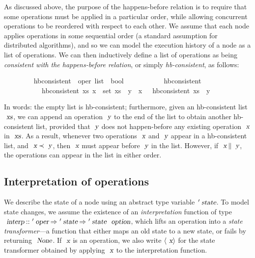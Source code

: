 As discussed above, the purpose of the happens-before relation is to require that some operations must be applied in a particular order, while allowing concurrent operations to be reordered with respect to each other.
We assume that each node applies operations in some sequential order (a standard assumption for distributed algorithms), and so we can model the execution history of a node as a list of operations.
We can then inductively define a list of operations as being \emph{consistent with the happens-before relation}, or simply \emph{hb-consistent}, as follows:
\vspace{0.25em}
\begin{isabellebody}
\ \ \ \ \ \ \ \  hb{\isacharunderscore}consistent\ {\isacharcolon}{\isacharcolon}\ {\isachardoublequoteopen}{\isacharprime}oper\ list\ {\isasymRightarrow}\ bool{\isachardoublequoteclose}\ \isanewline
\ \ \ \ \ \ \ \ \ \ {\isachardoublequoteopen}hb{\isacharunderscore}consistent\ {\isacharbrackleft}{\isacharbrackright}{\isachardoublequoteclose}\ {\isacharbar}\isanewline
\ \ \ \ \ \ \ \ \ \ {\isachardoublequoteopen}{\isasymlbrakk}\ hb{\isacharunderscore}consistent\ xs{\isacharsemicolon}\ {\isasymforall}x\ {\isasymin}\ set\ xs{\isachardot}\ {\isasymnot}\ y\ {\isasymprec}\ x\ {\isasymrbrakk}\ {\isasymLongrightarrow}\ hb{\isacharunderscore}consistent\ {\isacharparenleft}xs\ {\isacharat}\ {\isacharbrackleft}y{\isacharbrackright}{\isacharparenright}{\isachardoublequoteclose}
\end{isabellebody}
\vspace{0.25em}
In words: the empty list is hb-consistent; furthermore, given an hb-consistent list $\isa{xs}$, we can append an operation $\isa{y}$ to the end of the list to obtain another hb-consistent list, provided that $\isa{y}$ does not happen-before any existing operation $\isa{x}$ in $\isa{xs}$. As a result, whenever two operations $\isa{x}$ and $\isa{y}$ appear in a hb-consistent list, and $\isa{x}\prec\isa{y}$, then $\isa{x}$ must appear before $\isa{y}$ in the list. However, if $\isa{x}\mathbin{\isasymparallel}\isa{y}$, the operations can appear in the list in either order.

\subsection{Interpretation of operations}\label{sect.ops.interpretation}

We describe the state of a node using an abstract type variable $\isacharprime\isa{state}$.
To model state changes, we assume the existence of an \emph{interpretation} function of type $\isa{interp} \mathbin{\isacharcolon\isacharcolon} \isacharprime\isa{oper} \mathbin{\isasymRightarrow} \isacharprime\isa{state} \mathbin{\isasymRightarrow} \isacharprime\isa{state}\ \isa{option}$, which lifts an operation into a \emph{state transformer}---a function that either maps an old state to a new state, or fails by returning $\isa{None}$.
If $\isa{x}$ is an operation, we also write $\langle\isa{x}\rangle$ for the state transformer obtained by applying $\isa{x}$ to the interpretation function.

